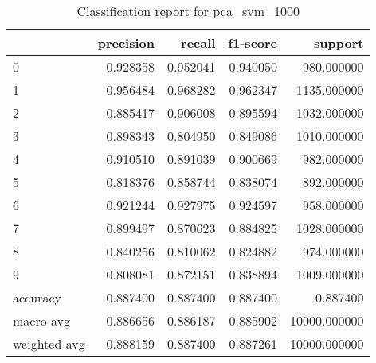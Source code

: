 \begin{table}[htb!]
\centering
\caption{Classification report for pca_svm_1000}
\label{tab:classification-report-pca_svm_1000}
\begin{tabular}{lrrrr}
\toprule
 & precision & recall & f1-score & support \\
\midrule
0 & 0.928358 & 0.952041 & 0.940050 & 980.000000 \\
1 & 0.956484 & 0.968282 & 0.962347 & 1135.000000 \\
2 & 0.885417 & 0.906008 & 0.895594 & 1032.000000 \\
3 & 0.898343 & 0.804950 & 0.849086 & 1010.000000 \\
4 & 0.910510 & 0.891039 & 0.900669 & 982.000000 \\
5 & 0.818376 & 0.858744 & 0.838074 & 892.000000 \\
6 & 0.921244 & 0.927975 & 0.924597 & 958.000000 \\
7 & 0.899497 & 0.870623 & 0.884825 & 1028.000000 \\
8 & 0.840256 & 0.810062 & 0.824882 & 974.000000 \\
9 & 0.808081 & 0.872151 & 0.838894 & 1009.000000 \\
accuracy & 0.887400 & 0.887400 & 0.887400 & 0.887400 \\
macro avg & 0.886656 & 0.886187 & 0.885902 & 10000.000000 \\
weighted avg & 0.888159 & 0.887400 & 0.887261 & 10000.000000 \\
\bottomrule
\end{tabular}
\end{table}
